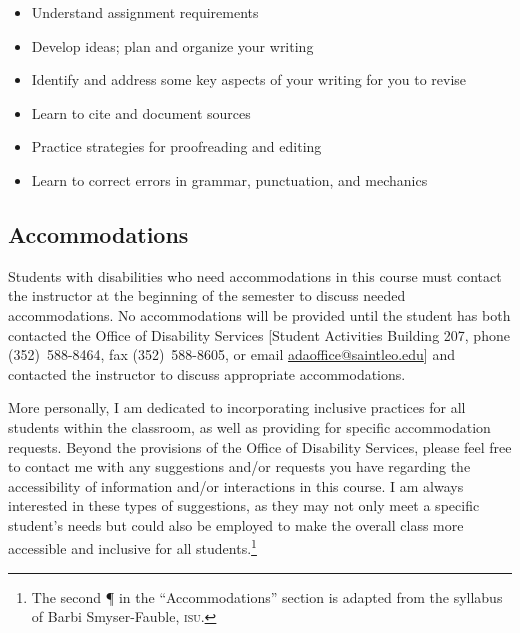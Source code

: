 \documentclass[11pt,oneside]{amsart}	%
\begin{document}
\begin{itemize}
	\item Understand assignment requirements
	\item Develop ideas; plan and organize your writing
	\item Identify and address some key aspects of your writing for you to revise
	\item Learn to cite and document sources
	\item Practice strategies for proofreading and editing
	\item Learn to correct errors in grammar, punctuation, and mechanics
\end{itemize}


\subsection{Accommodations} %
\label{sub:accommodations}
Students with disabilities who need accommodations in this course must contact the instructor at the beginning of the semester to discuss needed accommodations. No accommodations will be provided until the student has both contacted the Office of Disability Services [Student Activities Building 207, phone \mbox{(352)~588-8464}, fax \mbox{(352)~588-8605}, or email \href{mailto:adaoffice@saintleo.edu}{adaoffice@saintleo.edu}] and contacted the instructor to discuss appropriate accommodations.

More personally, I am dedicated to incorporating inclusive practices for all students within the classroom, as well as providing for specific accommodation requests. Beyond the provisions of the Office of Disability Services, please feel free to contact me with any suggestions and/or requests you have regarding the accessibility of information and/or interactions in this course. I am always interested in these types of suggestions, as they may not only meet a specific student's needs but could also be employed to make the overall class more accessible and inclusive for all students.\footnote{The second ¶ in the ``Accommodations'' section is adapted from the syllabus of Barbi Smyser-Fauble, \textsc{isu}.}



\end{document}

